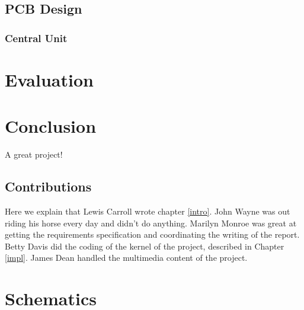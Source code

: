 \documentclass{l3proj}
\begin{document}
\section{PCB Design}
\label{pcb}

\subsection{Central Unit}

\chapter{Evaluation}

\chapter{Conclusion}

A great project!

\section{Contributions}

Here we explain that Lewis Carroll wrote chapter \ref{intro}. John Wayne
was out riding his horse every day and didn't do anything. Marilyn Monroe
was great at getting the requirements specification and coordinating the
writing of the report. Betty Davis did the coding of the kernel of the
project, described in Chapter \ref{impl}.  James Dean handled the
multimedia content of the project.



\newpage
\appendix
\chapter{Schematics}
\end{document}
